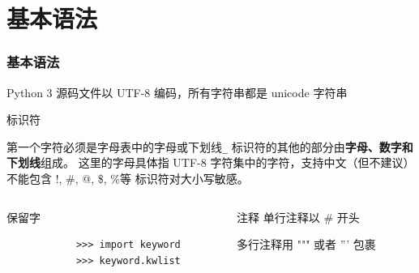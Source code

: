 \documentclass[10pt]{beamer}
\begin{document}
\section{基本语法}
\begin{frame}[fragile]
\frametitle{基本语法}
Python 3 源码文件以 UTF-8 编码，所有字符串都是 unicode 字符串

\begin{block}{标识符}
    \begin{outline}
        \1 第一个字符必须是字母表中的字母或下划线\texttt{_}
        \1 标识符的其他的部分由\textbf{字母、数字和下划线}组成。
        \2 这里的字母具体指 UTF-8 字符集中的字符，支持中文（但不建议）
        \2 不能包含 !, \#, @, \$, \%等
        \1 标识符对大小写敏感。
    \end{outline}
\end{block}


\begin{columns}
    \begin{column}{0.5\textwidth}
        \begin{block}{保留字}
            \begin{verbatim}
            >>> import keyword
            >>> keyword.kwlist
            \end{verbatim}
            \end{block}
    \end{column}
    \begin{column}{0.5\textwidth}
        \begin{block}{注释}
            单行注释以 \# 开头

            多行注释用 """ 或者 ''' 包裹
        \end{block}
    \end{column}

\end{columns}

\end{frame}
\end{document}
